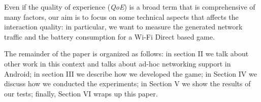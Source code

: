 Even if the quality of experience (\textit{QoE}) is a broad term that is
comprehensive of many factors\cite{bib:moeller-qoe}, our aim is to focus on
some technical aspects that affects the interaction quality: in particular, we
want to measure the generated network traffic and the battery consumption for
a Wi-Fi Direct based game.

The remainder of the paper is organized as follows: in section II we talk about
other work in this context and talks about ad-hoc networking support in Android;
in section III we describe how we developed the game; in Section IV we discuss
how we conducted the experiments; in Section V we show the results of our tests;
finally, Section VI wraps up this paper.
